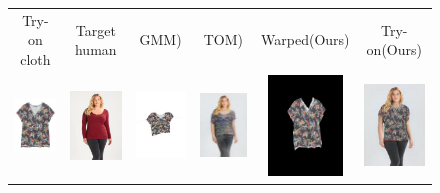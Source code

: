\begin{figure}[t]
   \centering
\begin{tabular}{cc|cc|cc}

Try-on cloth&Target human&GMM\cite{Wang2018TowardCI})&TOM\cite{Wang2018TowardCI})&Warped(Ours)&Try-on(Ours)\\

\includegraphics[width=2cm]{figures/cloth/002353_1.jpg}&
\includegraphics[width=2cm]{figures/image/007029_0.jpg}&
\includegraphics[width=2cm]{figures/cp-vton/warp-cloth/002353_1_007029_0.jpg}&
\includegraphics[width=2cm]{figures/cp-vton/try-on/002353_1_007029_0.jpg}&
\includegraphics[width=2cm]{figures/c3dwfull/002353_1_007029_0.png}&
\includegraphics[width=2cm]{figures/try-on/002353_1_007029_0.jpg}\\


\end{tabular}
\end{figure}
